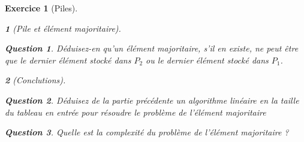 \documentclass{article}
\theoremstyle{exostyle}
\newtheorem{exo}{Exercice}
\theoremstyle{partiestyle}
\newtheorem{partie}{}[exo]
\theoremstyle{questionstyle}
\newtheorem{questionpartie}{Question}[partie]
\begin{document}
\begin{exo}[Piles]
\begin{partie}[Pile et élément majoritaire]
\begin{questionpartie}
            Déduisez-en qu'un élément majoritaire, s'il en existe, ne peut être que le dernier élément stocké dans $P_2$ ou le dernier élément stocké dans $P_1$.
        \end{questionpartie}
    \end{partie}
    \begin{partie}[Conclutions]        
        \begin{questionpartie}
            Déduisez de la partie précédente un algorithme linéaire en la taille du tableau en entrée pour résoudre le problème de l'élément majoritaire
        \end{questionpartie}             
        \begin{questionpartie}
            Quelle est la complexité du problème de l'élément majoritaire ?
        \end{questionpartie}             
    \end{partie}

\end{exo}
\end{document}
